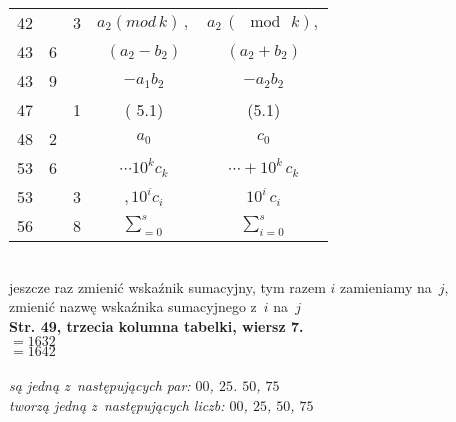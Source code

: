 \documentclass[a4paper,11pt]{article}
\numberwithin{equation}{section}
\begin{document}
\begin{center}
\begin{tabular}{|c|c|c|c|c|}
    42  & &  3 & $a_{ 2 } ( mod \, k ) \, ,$ & $a_{ 2 } \, ( \mod \, k ),$ \\
    43  &  6 & & $( a_{ 2 } - b_{ 2 } )$ & $( a_{ 2 } + b_{ 2 } )$ \\
    43  &  9 & & $- a_{ 1 } b_{ 2 }$ & $- a_{ 2 } b_{ 2 }$ \\
    47  & &  1 & ( 5.1) & (5.1) \\
    48  &  2 & & $a_{ 0 }$ & $c_{ 0 }$ \\
    53  &  6 & & $\cdots 10^{ k } c_{ k }$ & $\cdots + 10^{ k } \, c_{ k }$ \\
    53  & &  3 & $, 10^{ i } c_{ i }$ & $10^{ i } \, c_{ i }$ \\
    56  & &  8 & $\displaystyle \sum_{ = 0 }^{ s }$
    & $\displaystyle \sum_{ i = 0 }^{ s }$ \\
    \hline
  \end{tabular}

\end{center}

\VerSpaceTwo


 \\
\Jest jeszcze raz zmienić wskaźnik sumacyjny, tym razem $i$ zamieniamy
na~$j$, \\
\PowinnoByc zmienić nazwę wskaźnika sumacyjnego z~$i$ na~$j$ \\
\textbf{Str. 49, trzecia kolumna tabelki, wiersz 7.} \\
\Jest $= 1632$ \\
\PowinnoByc $= 1642$ \\
 \\
\Jest \textit{są jedną z~następujących par: $00$, $25$. $50$, $75$} \\
\PowinnoByc \textit{tworzą jedną z~następujących liczb: $00$, $25$, $50$,
  $75$} \\











\printbibliography





\end{document}
